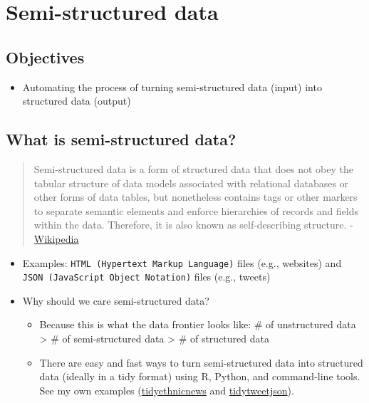 \documentclass[
]{book}
\providecommand{\tightlist}{%
  \setlength{\itemsep}{0pt}\setlength{\parskip}{0pt}}
\begin{document}
\hypertarget{semi_structured_data}{%
\chapter{Semi-structured data}\label{semi_structured_data}}

\hypertarget{objectives-3}{%
\section{Objectives}\label{objectives-3}}

\begin{itemize}
\tightlist
\item
  Automating the process of turning semi-structured data (input) into structured data (output)
\end{itemize}

\hypertarget{what-is-semi-structured-data}{%
\section{What is semi-structured data?}\label{what-is-semi-structured-data}}

\begin{quote}
Semi-structured data is a form of structured data that does not obey the tabular structure of data models associated with relational databases or other forms of data tables, but nonetheless contains tags or other markers to separate semantic elements and enforce hierarchies of records and fields within the data. Therefore, it is also known as self-describing structure. - \href{https://en.wikipedia.org/wiki/Semi-structured_data\#:~:text=Semi\%2Dstructured\%20data\%20is\%20a,and\%20fields\%20within\%20the\%20data.}{Wikipedia}
\end{quote}

\begin{itemize}
\item
  Examples: \texttt{HTML\ (Hypertext\ Markup\ Language)} files (e.g., websites) and \texttt{JSON\ (JavaScript\ Object\ Notation)} files (e.g., tweets)
\item
  Why should we care semi-structured data?

  \begin{itemize}
  \tightlist
  \item
    Because this is what the data frontier looks like: \# of unstructured data \textgreater{} \# of semi-structured data \textgreater{} \# of structured data
  \item
    There are easy and fast ways to turn semi-structured data into structured data (ideally in a tidy format) using R, Python, and command-line tools. See my own examples (\href{https://github.com/jaeyk/tidyethnicnews}{tidyethnicnews} and \href{https://github.com/jaeyk/tidytweetjson}{tidytweetjson}).
  \end{itemize}
\end{itemize}
\end{document}
